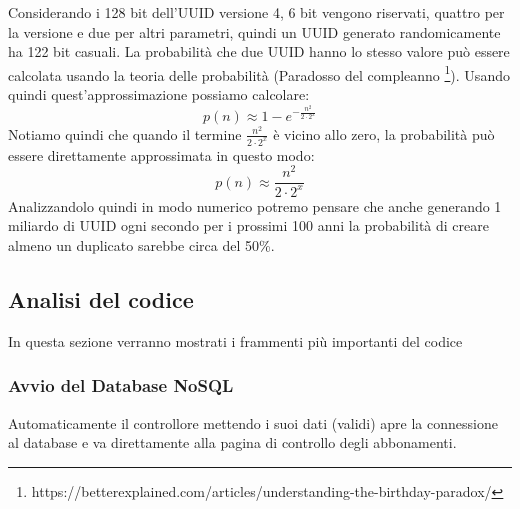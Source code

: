\hspace{\parindent}Considerando i 128 bit dell'UUID versione 4, 6 bit vengono riservati, quattro per la versione e due per altri parametri, quindi un UUID generato randomicamente ha 122 bit casuali. La probabilità che due UUID hanno lo stesso valore può essere calcolata usando la teoria delle probabilità (Paradosso del compleanno \footnote{https://betterexplained.com/articles/understanding-the-birthday-paradox/}). Usando quindi quest'approssimazione possiamo calcolare:
\begin{equation}
p(n) \approx 1- e^{-\frac{n^2}{2\cdot 2^x}}
\end{equation}
Notiamo quindi che quando il termine $ \frac{n^2}{2\cdot 2^x}$ è vicino allo zero, la probabilità può essere direttamente approssimata in questo modo:
\begin{equation}
p(n) \approx \frac{n^2}{2\cdot 2^x}
\end{equation}
Analizzandolo quindi in modo numerico potremo pensare che anche generando 1 miliardo di UUID ogni secondo per i prossimi 100 anni la probabilità di creare almeno un duplicato sarebbe circa del 50\%.


\subsection{Analisi del codice}
\hspace{\parindent}In questa sezione verranno mostrati i frammenti più importanti del codice
\lstset{style=mystyle}
\subsubsection{Avvio del Database NoSQL}


Automaticamente il controllore mettendo i suoi dati (validi) apre la connessione al database e va direttamente alla pagina di controllo degli abbonamenti.

